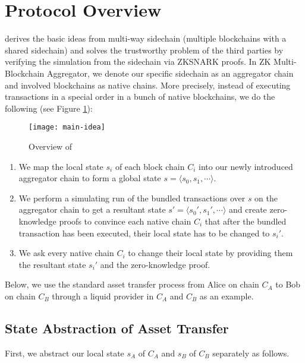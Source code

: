 \section{Protocol Overview}
\label{chp:case-study}

\dprotocol derives the basic ideas from multi-way sidechain (multiple blockchains with a shared sidechain) and solves the trustworthy problem of the third parties by verifying the simulation from the sidechain via ZKSNARK proofs. In ZK Multi-Blockchain Aggregator, we denote our specific sidechain as an aggregator chain and involved blockchains as native chains. More precisely, instead of executing transactions in a special order in a bunch of native blockchains, we do the following (see Figure \ref{main-idea}):

\begin{figure}[!ht]
\centerline{\texttt{[image: main-idea]}}
\caption{Overview of \dprotocol}\label{main-idea}
\end{figure}
\begin{enumerate}[leftmargin=*]
\item We map the local state $s_i$ of each block chain $C_i$ into our newly introduced aggregator chain to form a global state $s = \langle s_0, s_1, \cdots \rangle$.
\item We perform a simulating run of the bundled transactions over $s$ on the aggregator chain to get a resultant state $s' = \langle s_0', s_1', \cdots \rangle$ and create zero-knowledge proofs to convince each native chain $C_i$ that after the bundled transaction has been executed, their local state has to be changed to $s_i'$.
\item We ask every native chain $C_i$ to change their local state by providing them the resultant state $s_i'$ and the zero-knowledge proof.
\end{enumerate}
\smallskip
Below, we use the standard asset transfer process from Alice on chain $C_A$ to Bob on chain $C_B$ through a liquid provider in $C_A$ and $C_B$ \cite{introdefi} as an example. 



\subsection{State Abstraction of Asset Transfer}
First, 
we abstract our local state $s_A$ of $C_A$ and $s_B$ of $C_B$ separately as follows.

